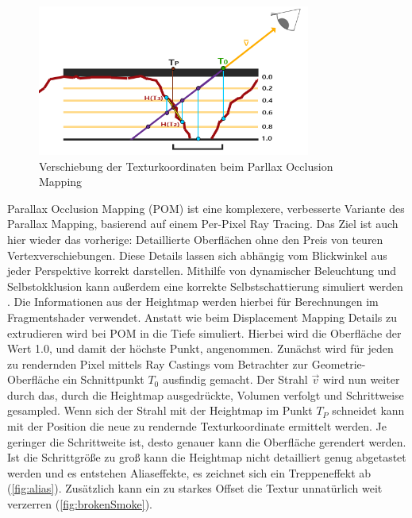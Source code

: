 \begin{figure}[h]
	\centering
	\includegraphics[width=0.8\textwidth]{Grafiken/Basics/Mapping/Infografik_POM.png}
	\begin{footnotesize}
		\caption{Verschiebung der Texturkoordinaten beim Parllax Occlusion Mapping}
	\end{footnotesize}
\end{figure}


Parallax Occlusion Mapping (POM) ist eine komplexere, verbesserte Variante des Parallax Mapping, basierend auf einem Per-Pixel Ray Tracing.
Das Ziel ist auch hier wieder das vorherige: Detaillierte Oberflächen ohne den Preis von teuren Vertexverschiebungen.
Diese Details lassen sich abhängig vom Blickwinkel aus jeder Perspektive korrekt darstellen.
Mithilfe von dynamischer Beleuchtung und Selbstokklusion kann außerdem eine korrekte Selbstschattierung simuliert werden \parencite{Brawley2004, Tatarchuk2006}.
Die Informationen aus der Heightmap werden hierbei für Berechnungen im Fragmentshader verwendet.
Anstatt wie beim Displacement Mapping Details zu extrudieren wird bei POM in die Tiefe simuliert.
Hierbei wird die Oberfläche der Wert 1.0, und damit der höchste Punkt, angenommen.
Zunächst wird für jeden zu rendernden Pixel mittels Ray Castings vom Betrachter zur Geometrie-Oberfläche ein Schnittpunkt  $T_0$ ausfindig gemacht.
Der Strahl $\vec{v}$ wird nun weiter durch das, durch die Heightmap ausgedrückte, Volumen verfolgt und Schrittweise gesampled. Wenn sich der Strahl 
mit der Heightmap im Punkt $T_P$ schneidet
kann mit der Position die neue zu rendernde Texturkoordinate ermittelt werden. Je geringer die Schrittweite ist, desto genauer kann die Oberfläche gerendert werden.
Ist die Schrittgröße zu groß kann die Heightmap nicht detailliert genug abgetastet werden und es entstehen Aliaseffekte, es zeichnet sich
ein Treppeneffekt ab (\autoref{fig:alias}). Zusätzlich kann ein zu starkes Offset die Textur unnatürlich weit verzerren (\autoref{fig:brokenSmoke}). 


